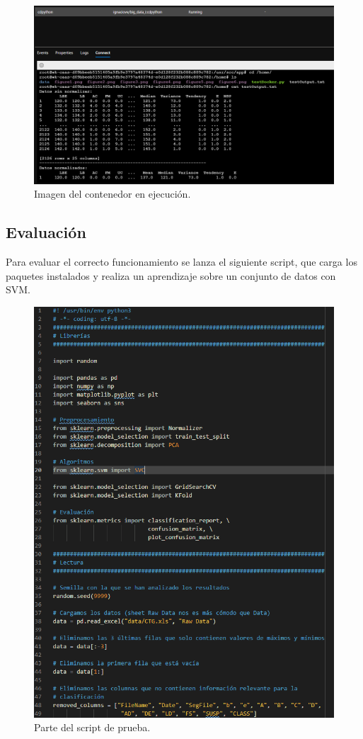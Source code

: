 \begin{figure}[H]\center\includegraphics[width=.87\linewidth]{img/python/p9.png}\caption{Imagen del contenedor en ejecución.}\end{figure}

\subsection{Evaluación}

Para evaluar el correcto funcionamiento se lanza el siguiente script, que carga los paquetes instalados y realiza un aprendizaje sobre un conjunto de datos con SVM.

\begin{figure}[H]\center\includegraphics[width=.95\linewidth]{img/python/p6.png}\caption{Parte del script de prueba.}\end{figure}